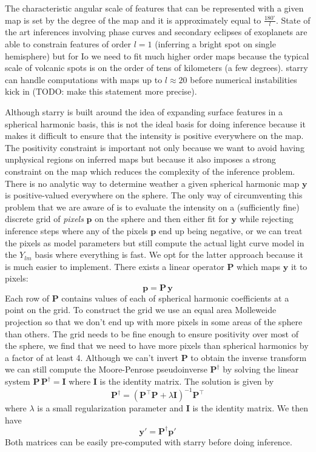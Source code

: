 \documentclass[modern]{aastex62}
\begin{document}
The characteristic angular scale of features that can be represented with a given map is set by the degree of the map and it is approximately equal to $\frac{180^\circ}{l}$.
State of the art inferences involving phase curves and secondary eclipses of exoplanets are able to constrain features of order $l=1$ (inferring a bright spot on single hemisphere) but for Io we need to fit much higher order maps because the typical scale of volcanic spots is on the order of tens of kilometers (a few degrees).
\textsf{starry} can handle computations with maps up to $l\approx 20$ before numerical instabilities kick in (TODO: make this statement more precise).

Although \textsf{starry} is built around the idea of expanding surface features in a spherical harmonic basis, this is not the ideal basis for doing inference because it makes it difficult to ensure that the intensity is positive everywhere on the map.
The positivity constraint is important not only because we want to avoid having unphysical regions on inferred maps but because it also imposes a strong constraint on the map which reduces the complexity of the inference problem.
There is no analytic way to determine weather a given spherical harmonic map $\mathbf{y}$ is positive-valued everywhere on the sphere. 
The only way of circumventing this problem that we are aware of is to evaluate the intensity on a (sufficiently fine) discrete grid of \emph{pixels} $\mathbf{p}$ on the sphere and then either fit for $\mathbf{y}$ while rejecting inference steps where any of the pixels $\mathbf{p}$ end up being negative, or we can treat the pixels as model parameters but still compute the actual light curve model in the $Y_{lm}$ basis where everything is fast. 
We opt for the latter approach because it is much easier to implement.
There exists a linear operator $\mathbf{P}$ which maps $\mathbf{y}$ it to pixels:
\begin{equation}
    \mathbf{p}=\mathbf{P}\,\mathbf{y}
\end{equation}
Each row of $\mathbf{P}$ contains values of each of spherical harmonic coefficients at a point on the grid. 
To construct the grid we use an equal area Molleweide projection so that we don't end up with more pixels in some areas of the sphere than others.
The grid needs to be fine enough to ensure positivity over most of the sphere, we find that we need to have more pixels than spherical harmonics by a factor of at least 4.
Although we can't invert $\mathbf{P}$ to obtain the inverse transform we can still compute the Moore-Penrose pseudoinverse $\mathbf{P}^\dagger$ by solving the linear system $\mathbf{P}\,\mathbf{P}^\dagger=\mathbf{I}$ where $\mathbf{I}$ is the identity matrix. 
The solution is given by
\begin{equation}
\mathbf{P}^\dagger=\left(\mathbf{P}^{\top} \mathbf{P}+\lambda \mathbf{I}\right)^{-1} \mathbf{P}^{\top}
\end{equation}
where $\lambda$ is a small regularization parameter and $\mathbf{I}$ is the identity matrix.
We then have 
\begin{equation}
    \mathbf{y}'=\mathbf{P}^\dagger\mathbf{p}'
\end{equation}
Both matrices can be easily pre-computed with \textsf{starry} before doing inference.
\end{document}

